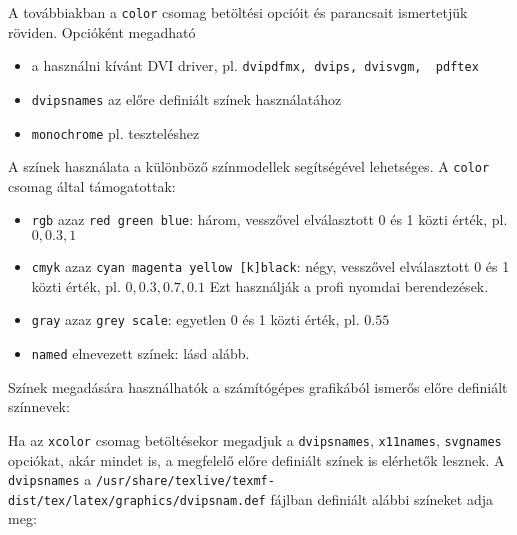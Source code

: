 \documentclass{article}
\begin{document}
A továbbiakban a \verb!color! csomag betöltési opcióit és parancsait ismertetjük röviden.
Opcióként megadható
\begin{itemize}
	\item a használni kívánt DVI driver, pl. \verb!dvipdfmx, dvips, dvisvgm,  pdftex!
	\item \verb!dvipsnames! az előre definiált színek használatához
	\item \verb!monochrome! pl. teszteléshez
\end{itemize}
A színek használata a különböző színmodellek segítségével lehetséges. A \verb!color! csomag által támogatottak:
\begin{itemize}
	\item \verb!rgb! azaz \verb!red green blue!: három, vesszővel elválasztott 0 és 1 közti érték, pl. $0, 0.3, 1$
	\item \verb!cmyk! azaz \verb!cyan magenta yellow [k]black!: négy, vesszővel elválasztott 0 és 1 közti érték, pl. $0, 0.3, 0.7, 0.1$
	Ezt használják a profi nyomdai berendezések.
	\item \verb!gray! azaz \verb!grey scale!: egyetlen 0 és 1 közti érték, pl. $0.55$
	\item \verb!named! elnevezett színek: lásd alább.
\end{itemize}	
 Színek megadására használhatók a számítógépes grafikából ismerős előre definiált színnevek:

\vspace*{2ex}\vspace*{2ex}

Ha az \verb!xcolor! csomag betöltésekor megadjuk a \verb!dvipsnames!, \verb!x11names!, \verb!svgnames! opciókat, akár mindet is, a megfelelő előre definiált színek is elérhetők lesznek. A \verb!dvipsnames!   a 
\verb!/usr/share/texlive/texmf-dist/tex/latex/graphics/dvipsnam.def! fájlban definiált alábbi színeket adja meg: 
\end{document}
